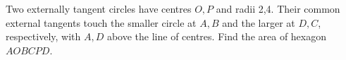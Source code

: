 Two externally tangent circles have centres $ O,P $ and radii 2,4. Their common external tangents touch the smaller circle at $ A,B $ and the larger at $ D,C $, respectively, with $ A,D $ above the line of centres. Find the area of hexagon $ AOBCPD $.
